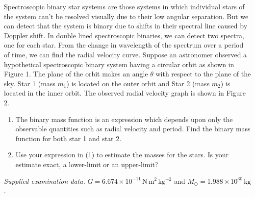 Spectroscopic binary star systems are those systems in which individual stars of the system can't be resolved visually due to their low angular separation. But we can detect that the system is binary due to shifts in their spectral line caused by Doppler shift. In double lined spectroscopic binaries, we can detect two spectra, one for each star. From the change in wavelength of the spectrum over a period of time, we can find the radial velocity curve.
Suppose an astronomer observed a hypothetical spectroscopic binary system having a circular orbit as shown in Figure 1. The plane of the orbit makes an angle $\theta$ with respect to the plane of the sky. Star 1 (mass $m_1$) is located on the outer orbit and Star 2 (mass $m_2$) is located in the inner orbit. The observed radial velocity graph is shown in Figure 2.
\begin{enumerate}
\item The binary mass function is an expression which depends upon only the observable quantities such as radial velocity and period. Find the binary mass function for both star 1 and star 2.
\item Use your expression in (1) to estimate the masses for the stars. Is your estimate exact, a lower-limit or an upper-limit?
\end{enumerate}
\textit{Supplied examination data.} $G=6.674\times10^{-11}\,\mathrm{N\,m^2\,kg^{-2}}$ and $M_\odot=1.988\times10^{30}\,\mathrm{kg}$.
